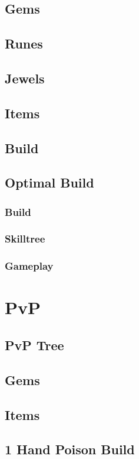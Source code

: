 \documentclass[12pt]{article}
\begin{document}
\subsection{Gems}
\subsection{Runes}
\subsection{Jewels}
\subsection{Items}
\subsection{Build}
\subsection{Optimal Build}
\subsubsection{Build}
\subsubsection{Skilltree}
\subsubsection{Gameplay}

\newpage


\section{PvP}
\subsection{PvP Tree}
\subsection{Gems}
\subsection{Items}
\subsection{1 Hand Poison Build}
\end{document}
